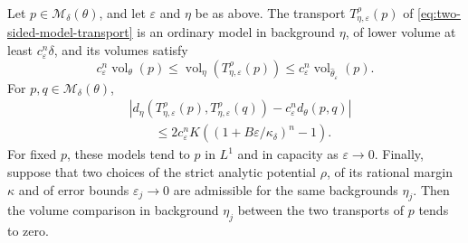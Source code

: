 \begin{theorem}\label{thm:two-sided-model-transport}
Let $p\in\mathcal M_\delta(\theta)$, and let $\varepsilon$ and $\eta$ be as above. The transport $T^\rho_{\eta,\varepsilon}(p)$ of \eqref{eq:two-sided-model-transport} is an ordinary model in background $\eta$, of lower volume at least $c_\varepsilon^n\delta$, and its volumes satisfy
\begin{equation}\label{eq:two-sided-transport-volume}
 c_\varepsilon^n\operatorname{vol}_\theta(p)
 \leq\operatorname{vol}_\eta(T^\rho_{\eta,\varepsilon}(p))
 \leq c_\varepsilon^n\operatorname{vol}_{\widehat\theta_\varepsilon}(p).
\end{equation}
For $p,q\in\mathcal M_\delta(\theta)$,
\begin{equation}\label{eq:two-sided-comparison-error}
 \begin{split}
 &\left|d_\eta(T^\rho_{\eta,\varepsilon}(p),T^\rho_{\eta,\varepsilon}(q))
                  -c_\varepsilon^n d_\theta(p,q)\right|\\
 &\qquad\leq2c_\varepsilon^nK
       \left((1+B\varepsilon/\kappa_\delta)^n-1\right).
 \end{split}
\end{equation}
For fixed $p$, these models tend to $p$ in $L^1$ and in capacity as $\varepsilon\to0$. Finally, suppose that two choices of the strict analytic potential $\rho$, of its rational margin $\kappa$ and of error bounds $\varepsilon_j\to0$ are admissible for the same backgrounds $\eta_j$. Then the volume comparison in background $\eta_j$ between the two transports of $p$ tends to zero.
\end{theorem}
